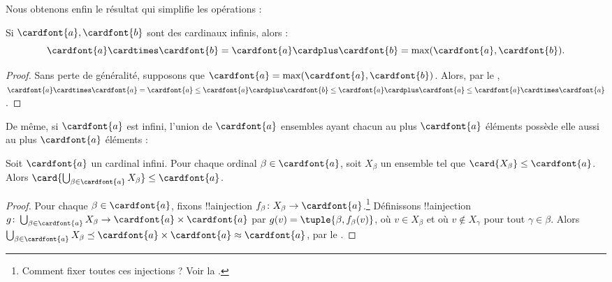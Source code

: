 \documentclass[../../../include/open-logic-section]{subfiles}
\begin{document}
Nous obtenons enfin le résultat qui simplifie
les opérations :

\begin{thm}
Si $\cardfont{a}, \cardfont{b}$ sont des
cardinaux infinis, alors :
\[
	\cardfont{a}
\cardtimes \cardfont{b}
= \cardfont{a} \cardplus \cardfont{b}
= \text{max}(\cardfont{a}, \cardfont{b}).
\]
\end{thm}

\begin{proof}
Sans perte de généralité, supposons que
$\cardfont{a} = \max(\cardfont{a}, \cardfont{b})$.
Alors, par le ,
$\cardfont{a}\cardtimes\cardfont{a}
= \cardfont{a}
\leq \cardfont{a}\cardplus \cardfont{b}
\leq \cardfont{a} \cardplus \cardfont{a}
\leq \cardfont{a} \cardtimes\cardfont{a}$.
\end{proof}
\noindent
De même, si $\cardfont{a}$ est infini,
l'union de $\cardfont{a}$ ensembles ayant
chacun au plus $\cardfont{a}$ éléments
possède elle aussi au plus $\cardfont{a}$ éléments :

\begin{prop}
Soit $\cardfont{a}$ un cardinal infini.
Pour chaque ordinal $\beta \in \cardfont{a}$,
soit $X_\beta$ un ensemble tel que
$\card{X_\beta} \leq \cardfont{a}$.
Alors
$\card{\bigcup_{\beta \in \cardfont{a}} X_\beta}
\leq \cardfont{a}$.
\end{prop}

\begin{proof}
Pour chaque $\beta \in \cardfont{a}$,
fixons !!a{injection}
$f_\beta \colon X_\beta \to \cardfont{a}$.\footnote{
Comment fixer toutes ces injections ?
Voir la .}
Définissons !!a{injection}
$g \colon \bigcup_{\beta \in \cardfont{a}} X_\beta
\to \cardfont{a} \times \cardfont{a}$
par $g(v) = \tuple{\beta, f_\beta(v)}$,
où $v \in X_\beta$ et où
$v \notin X_\gamma$ pour tout $\gamma \in \beta$.
Alors
$\bigcup_{\beta \in \cardfont{a}} X_\beta
\preceq \cardfont{a} \times \cardfont{a}
\approx \cardfont{a}$,
par le .
\end{proof}
\end{document}
